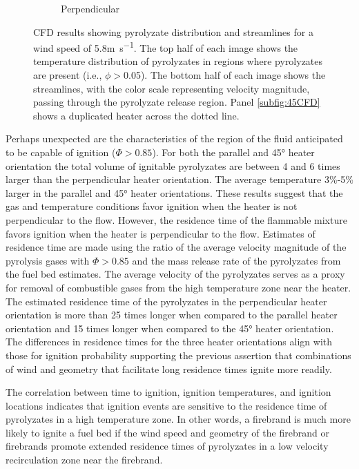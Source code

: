 \begin{figure}[hpbt]
\begin{subfigure}[b]{\columnwidth}
                 \caption{Perpendicular}
                 \label{subfig:perpendicularCFD}
             \end{subfigure}
                \caption{CFD results showing pyrolyzate distribution and streamlines for a wind speed of 5.8\si{\meter\per\second}. The top half of each image shows the temperature distribution of pyrolyzates in regions where pyrolyzates are present (i.e., $\phi>$0.05). The bottom half of each image shows the streamlines, with the color scale representing velocity magnitude, passing through the pyrolyzate release region. Panel \ref{subfig:45CFD} shows a duplicated heater across the dotted line.}
                \label{fig:CFDImages}
        \end{figure}
    Perhaps unexpected are the characteristics of the region of the fluid anticipated to be capable of ignition ($\Phi>0.85$). For both the parallel and 45\si{\degree} heater orientation the total volume of ignitable pyrolyzates are between 4 and 6 times larger than the perpendicular heater orientation. The average temperature 3\%-5\% larger in the parallel and 45\si{\degree} heater orientations. These results suggest that the gas and temperature conditions favor ignition when the heater is not perpendicular to the flow. However, the residence time of the flammable mixture favors ignition when the heater is perpendicular to the flow. Estimates of residence time are made using the ratio of the average velocity magnitude of the pyrolysis gases with $\Phi>0.85$ and the mass release rate of the pyrolyzates from the fuel bed estimates. The average velocity of the pyrolyzates serves as a proxy for removal of combustible gases from the high temperature zone near the heater. The estimated residence time of the pyrolyzates in the perpendicular heater orientation is more than 25 times longer when compared to the parallel heater orientation and 15 times longer when compared to the 45\si{\degree} heater orientation. The differences in residence times for the three heater orientations align with those for ignition probability supporting the previous assertion that combinations of wind and geometry that facilitate long residence times ignite more readily.
    
    The correlation between time to ignition, ignition temperatures, and ignition locations indicates that ignition events are sensitive to the residence time of pyrolyzates in a high temperature zone. In other words, a firebrand is much more likely to ignite a fuel bed if the wind speed and geometry of the firebrand or firebrands promote extended residence times of pyrolyzates in a low velocity recirculation zone near the firebrand.
   
